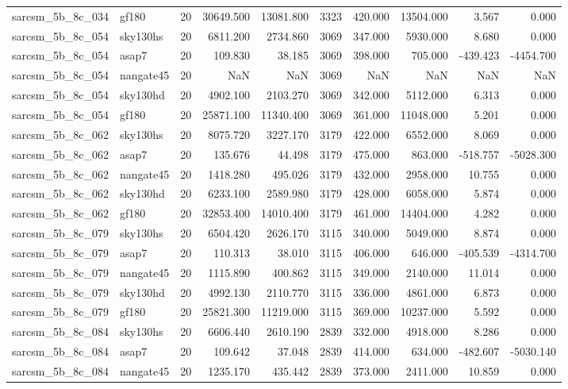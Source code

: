 \documentclass{article}
\begin{document}
\begin{longtable}{llrrrrrrrr}
sarcsm\_5b\_8c\_034 & gf180 & 20 & 30649.500 & 13081.800 & 3323 & 420.000 & 13504.000 & 3.567 & 0.000 \\
sarcsm\_5b\_8c\_054 & sky130hs & 20 & 6811.200 & 2734.860 & 3069 & 347.000 & 5930.000 & 8.680 & 0.000 \\
sarcsm\_5b\_8c\_054 & asap7 & 20 & 109.830 & 38.185 & 3069 & 398.000 & 705.000 & -439.423 & -4454.700 \\
sarcsm\_5b\_8c\_054 & nangate45 & 20 & NaN & NaN & 3069 & NaN & NaN & NaN & NaN \\
sarcsm\_5b\_8c\_054 & sky130hd & 20 & 4902.100 & 2103.270 & 3069 & 342.000 & 5112.000 & 6.313 & 0.000 \\
sarcsm\_5b\_8c\_054 & gf180 & 20 & 25871.100 & 11340.400 & 3069 & 361.000 & 11048.000 & 5.201 & 0.000 \\
sarcsm\_5b\_8c\_062 & sky130hs & 20 & 8075.720 & 3227.170 & 3179 & 422.000 & 6552.000 & 8.069 & 0.000 \\
sarcsm\_5b\_8c\_062 & asap7 & 20 & 135.676 & 44.498 & 3179 & 475.000 & 863.000 & -518.757 & -5028.300 \\
sarcsm\_5b\_8c\_062 & nangate45 & 20 & 1418.280 & 495.026 & 3179 & 432.000 & 2958.000 & 10.755 & 0.000 \\
sarcsm\_5b\_8c\_062 & sky130hd & 20 & 6233.100 & 2589.980 & 3179 & 428.000 & 6058.000 & 5.874 & 0.000 \\
sarcsm\_5b\_8c\_062 & gf180 & 20 & 32853.400 & 14010.400 & 3179 & 461.000 & 14404.000 & 4.282 & 0.000 \\
sarcsm\_5b\_8c\_079 & sky130hs & 20 & 6504.420 & 2626.170 & 3115 & 340.000 & 5049.000 & 8.874 & 0.000 \\
sarcsm\_5b\_8c\_079 & asap7 & 20 & 110.313 & 38.010 & 3115 & 406.000 & 646.000 & -405.539 & -4314.700 \\
sarcsm\_5b\_8c\_079 & nangate45 & 20 & 1115.890 & 400.862 & 3115 & 349.000 & 2140.000 & 11.014 & 0.000 \\
sarcsm\_5b\_8c\_079 & sky130hd & 20 & 4992.130 & 2110.770 & 3115 & 336.000 & 4861.000 & 6.873 & 0.000 \\
sarcsm\_5b\_8c\_079 & gf180 & 20 & 25821.300 & 11219.000 & 3115 & 369.000 & 10237.000 & 5.592 & 0.000 \\
sarcsm\_5b\_8c\_084 & sky130hs & 20 & 6606.440 & 2610.190 & 2839 & 332.000 & 4918.000 & 8.286 & 0.000 \\
sarcsm\_5b\_8c\_084 & asap7 & 20 & 109.642 & 37.048 & 2839 & 414.000 & 634.000 & -482.607 & -5030.140 \\
sarcsm\_5b\_8c\_084 & nangate45 & 20 & 1235.170 & 435.442 & 2839 & 373.000 & 2411.000 & 10.859 & 0.000 \\

\end{longtable}
\end{document}
